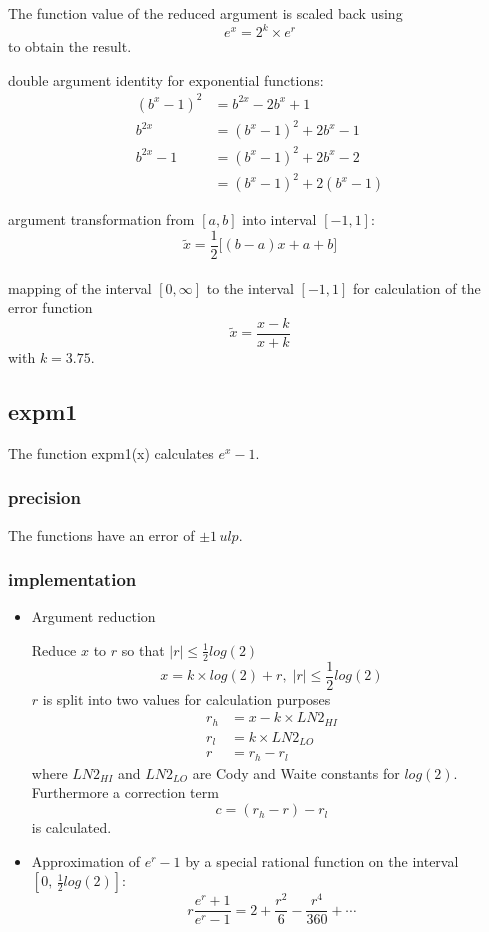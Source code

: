 \documentclass[10pt,a4paper,final,oneside]{article}
\numberwithin{equation}{subsection}
\begin{document}
 The function value of the reduced argument is scaled back using
    \begin{equation}
        e^x = 2^k \times e^r
    \end{equation}
    to obtain the result.



double argument identity for exponential functions:
\[
    \begin{aligned}
        (b^x-1)^2 &= b^{2x} - 2b^x + 1 \\
        b^{2x}    &= (b^x-1)^2 + 2b^x - 1 \\
        b^{2x} -1 &= (b^x-1)^2 + 2b^x -2 \\
                  &= (b^x-1)^2 + 2(b^x-1)
    \end{aligned}
\]

argument transformation from $ [a, b] $ into interval $ [-1, 1] $:
\[
    \tilde x = \frac{1}{2} \big[(b-a) x + a +b \big]
\]
\\[10pt]
mapping of the interval $ [0, \infty] $ to the interval $ [-1, 1] $ for
calculation of the error function
\[
    \tilde x = \frac{x-k}{x+k}
\]
with $ k = 3.75 $.


\subsection{expm1}
\label{sub_sec:expm1}
The function expm1(x) calculates $ e^x-1 $.

\subsubsection{precision}
The functions have an error of $ \pm 1\, ulp$.

\subsubsection{implementation}
\begin{itemize}
\item Argument reduction

    Reduce $x$ to $r$ so that $ |r| \le \frac{1}{2} log(2) $
    \begin{equation}
        x = k \times log(2) + r, \; |r| \le \frac{1}{2} log(2)
    \end{equation}
    $r$ is split into two values for calculation purposes
    \[
       \begin{aligned}
       r_h &= x - k \times LN2_{HI} \\
       r_l &= k \times LN2_{LO} \\
       r &= r_h - r_l
       \end{aligned}
    \]
    where $LN2_{HI}$ and $LN2_{LO}$ are Cody and Waite constants for $log(2)$.
    Furthermore a correction term
    \[
        c = (r_h - r) - r_l
    \]
    is calculated.

\item Approximation of $e^r-1$ by a special rational function on the interval
    $[0,\,\frac{1}{2}log(2)]$:
    \[
        r \frac{e^{r}+1}{e^{r}-1} =
        2+\frac{r^2}{6}-\frac{r^4}{360}+\cdots
    \]

\end{itemize}
\end{document}
